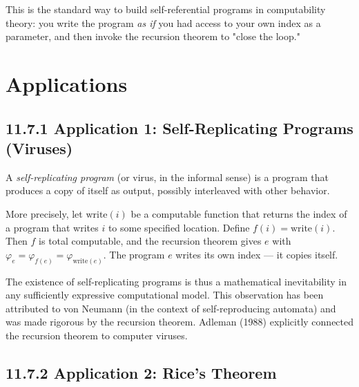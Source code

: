 This is the standard way to build self-referential programs in computability theory: you write the program \textit{as if} you had access to your own index as a parameter, and then invoke the recursion theorem to "close the loop."

\section{Applications}

\subsection{11.7.1 Application 1: Self-Replicating Programs (Viruses)}

A \textit{self-replicating program} (or virus, in the informal sense) is a program that produces a copy of itself as output, possibly interleaved with other behavior.

More precisely, let $\text{write}(i)$ be a computable function that returns the index of a program that writes $i$ to some specified location. Define $f(i) = \text{write}(i)$. Then $f$ is total computable, and the recursion theorem gives $e$ with $\varphi_e = \varphi_{f(e)} = \varphi_{\text{write}(e)}$. The program $e$ writes its own index --- it copies itself.

The existence of self-replicating programs is thus a mathematical inevitability in any sufficiently expressive computational model. This observation has been attributed to von Neumann (in the context of self-reproducing automata) and was made rigorous by the recursion theorem. Adleman (1988) explicitly connected the recursion theorem to computer viruses.

\subsection{11.7.2 Application 2: Rice's Theorem}

